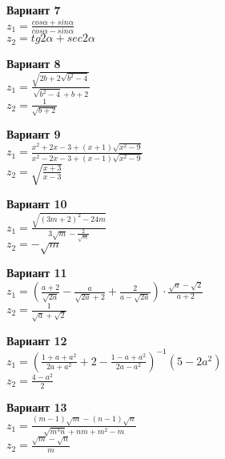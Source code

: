 \documentclass[11pt]{article} %
\begin{document}
\begin{flushleft}
\par 

\Large\textbf{Вариант 7} \\
$ z_1 = \frac{cos\alpha + sin\alpha}{cos\alpha - sin\alpha} $ \\
\vspace{0.5\baselineskip}
$ z_2 = tg 2\alpha + sec 2\alpha $ 

\par 

\Large\textbf{Вариант 8} \\
$ z_1 = \frac{\sqrt{2b + 2\sqrt{b^2 - 4}}}{\sqrt{b^2 - 4} + b + 2} $ \\
\vspace{0.5\baselineskip}
$ z_2 = \frac{1}{\sqrt{b + 2}} $

\par

\Large\textbf{Вариант 9} \\
$ z_1 = \frac{x^2 + 2x - 3 + \left(x + 1\right)\sqrt{x^2 - 9}}{x^2 - 2x - 3 + \left(x - 1\right)\sqrt{x^2 - 9}} $ \\
\vspace{0.5\baselineskip}
$ z_2 = \sqrt{\frac{x + 3}{x - 3}} $

\par

\Large\textbf{Вариант 10} \\
$ z_1 = \frac{\sqrt{\left(3m + 2\right)^2 - 24m}}{3\sqrt{m} - \frac{2}{\sqrt{m}}} $ \\
\vspace{0.5\baselineskip}
$ z_2 = -\sqrt{m} $

\par

\Large\textbf{Вариант 11} \\
$ z_1 = \left( \frac{a + 2}{\sqrt{2a}} - \frac{a}{\sqrt{2a} + 2} + \frac{2}{a - \sqrt{2a}} \right) \cdot \frac{\sqrt{a} - \sqrt{2}}{a + 2} $ \\
\vspace{0.5\baselineskip}
$ z_2 = \frac{1}{\sqrt{a} + \sqrt{2}} $

\par

\Large\textbf{Вариант 12} \\
$ z_1 = \left( \frac{1 + a + a^2}{2a + a^2} + 2 - \frac{1 - a + a^2}{2a - a^2} \right)^{-1} \left(5 - 2a^2 \right)  $ \\
\vspace{0.5\baselineskip}
$ z_2 = \frac{4 - a^2}{2} $

\par

\Large\textbf{Вариант 13} \\
$ z_1 = \frac{\left(m - 1\right)\sqrt{m} - \left(n - 1\right)\sqrt{n}}{\sqrt{m^3 n} + nm + m^2 - m} $ \\
\vspace{0.5\baselineskip}
$ z_2 = \frac{\sqrt{m} - \sqrt{n}}{m} $

\end{flushleft}
\end{document}
